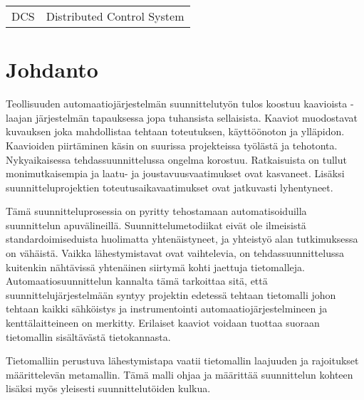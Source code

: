 \documentclass[finnish,12pt]{article}
\begin{document}

	\begin{tabular}{ll}
DCS        & Distributed Control System \\

	\end{tabular}

	\cleardoublepage
	\storeinipagenumber
	\setcounter{page}{1}


	\section{Johdanto}
	\thispagestyle{empty}

Teollisuuden automaatiojärjestelmän suunnittelutyön tulos koostuu kaavioista -
laajan järjestelmän tapauksessa jopa tuhansista sellaisista. Kaaviot muodostavat
kuvauksen joka mahdollistaa tehtaan toteutuksen, käyttöönoton ja ylläpidon.
Kaavioiden piirtäminen käsin on suurissa projekteissa työlästä ja tehotonta.
Nykyaikaisessa tehdassuunnittelussa ongelma korostuu.
Ratkaisuista on tullut monimutkaisempia ja laatu- ja joustavuusvaatimukset ovat kasvaneet.
Lisäksi suunnitteluprojektien toteutusaikavaatimukset ovat jatkuvasti lyhentyneet.
\cite{RefWorks:41}

Tämä suunnitteluprosessia on pyritty tehostamaan automatisoiduilla
suunnittelun apuvälineillä. Suunnittelumetodiikat eivät ole
ilmeisistä standardoimiseduista huolimatta yhtenäistyneet, ja yhteistyö alan
tutkimuksessa on vähäistä. Vaikka lähestymistavat ovat vaihtelevia, on
tehdassuunnittelussa kuitenkin nähtävissä yhtenäinen siirtymä kohti 
jaettuja tietomalleja. Automaatiosuunnittelun kannalta tämä tarkoittaa sitä, että
suunnittelujärjestelmään syntyy projektin edetessä tehtaan
tietomalli johon tehtaan kaikki sähköistys ja instrumentointi
automaatiojärjestelmineen ja kenttälaitteineen on merkitty. Erilaiset kaaviot
voidaan tuottaa suoraan tietomallin sisältävästä tietokannasta.

Tietomalliin perustuva lähestymistapa vaatii tietomallin laajuuden ja rajoitukset
määrittelevän metamallin. Tämä malli ohjaa ja määrittää suunnittelun kohteen lisäksi
myös yleisesti suunnittelutöiden kulkua.
\end{document}
